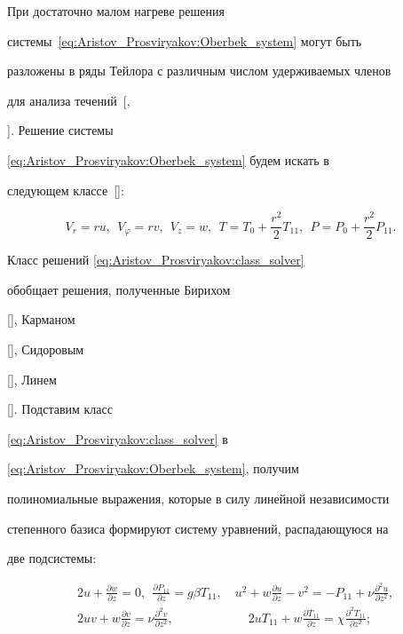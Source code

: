 При достаточно малом нагреве решения

системы~\eqref{eq:Aristov_Prosviryakov:Oberbek_system} могут быть

разложены в ряды Тейлора с различным числом удерживаемых членов

для анализа течений~[,

]. Решение системы

\eqref{eq:Aristov_Prosviryakov:Oberbek_system} будем искать в

следующем классе~[]:

\begin{equation}

V_r=ru, \ \ V_{\varphi}=rv, \ \ V_z=w, \ \ T=T_{0}+\frac{r^2}{2}T_{11}, \ \ P=P_{0}+\frac{r^2}{2}P_{11}.

\label{eq:Aristov_Prosviryakov:class_solver}

\end{equation}



Класс решений \eqref{eq:Aristov_Prosviryakov:class_solver}

обобщает решения, полученные Бирихом

[], Карманом

[], Сидоровым

[], Линем

[]. Подставим класс

\eqref{eq:Aristov_Prosviryakov:class_solver} в

\eqref{eq:Aristov_Prosviryakov:Oberbek_system}, получим

полиномиальные выражения, которые в силу линейной независимости

степенного базиса формируют систему уравнений, распадающуюся на

две подсистемы:

\begin{equation}

\label{eq:Aristov_Prosviryakov:main_system}

\begin{aligned}

&2u+\frac{\partial w}{\partial z}=0, \ \ \frac{\partial P_{11}}{\partial z}=g\beta T_{11},\quad

u^2+w\frac{\partial u}{\partial z}-v^2=-P_{11}+\nu \frac{\partial^2 u}{\partial z^2},\\

&2uv+w\frac{\partial v}{\partial z}=\nu \frac{\partial^2

v}{\partial z^2}, \qquad \qquad  \qquad 2uT_{11}+w\frac{\partial T_{11}}{\partial

z}=\chi \frac{\partial^2 T_{11}}{\partial z^2};

\end{aligned}

\end{equation}

